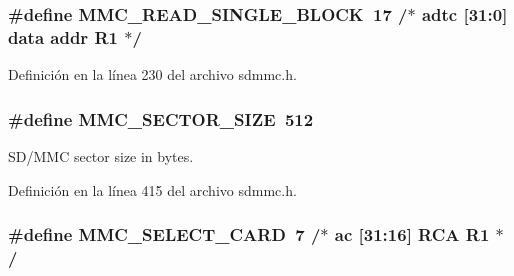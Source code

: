 \subsubsection[{\texorpdfstring{M\+M\+C\+\_\+\+R\+E\+A\+D\+\_\+\+S\+I\+N\+G\+L\+E\+\_\+\+B\+L\+O\+CK}{MMC_READ_SINGLE_BLOCK}}]{\setlength{\rightskip}{0pt plus 5cm}\#define M\+M\+C\+\_\+\+R\+E\+A\+D\+\_\+\+S\+I\+N\+G\+L\+E\+\_\+\+B\+L\+O\+CK~17		/$\ast$ adtc \mbox{[}31\+:0\mbox{]}  data addr  R1  $\ast$/}\hypertarget{group___c_h_i_p___s_d_m_m_c___definitions_gaa79d6d187ee2becb90a44ff70914acb8}{}\label{group___c_h_i_p___s_d_m_m_c___definitions_gaa79d6d187ee2becb90a44ff70914acb8}


Definición en la línea 230 del archivo sdmmc.\+h.

\subsubsection[{\texorpdfstring{M\+M\+C\+\_\+\+S\+E\+C\+T\+O\+R\+\_\+\+S\+I\+ZE}{MMC_SECTOR_SIZE}}]{\setlength{\rightskip}{0pt plus 5cm}\#define M\+M\+C\+\_\+\+S\+E\+C\+T\+O\+R\+\_\+\+S\+I\+ZE~512}\hypertarget{group___c_h_i_p___s_d_m_m_c___definitions_ga502a0143be4c303f3006c0888e1cec82}{}\label{group___c_h_i_p___s_d_m_m_c___definitions_ga502a0143be4c303f3006c0888e1cec82}


S\+D/\+M\+MC sector size in bytes. 



Definición en la línea 415 del archivo sdmmc.\+h.

\subsubsection[{\texorpdfstring{M\+M\+C\+\_\+\+S\+E\+L\+E\+C\+T\+\_\+\+C\+A\+RD}{MMC_SELECT_CARD}}]{\setlength{\rightskip}{0pt plus 5cm}\#define M\+M\+C\+\_\+\+S\+E\+L\+E\+C\+T\+\_\+\+C\+A\+RD~7		/$\ast$ ac   \mbox{[}31\+:16\mbox{]} R\+CA        R1  $\ast$/}\hypertarget{group___c_h_i_p___s_d_m_m_c___definitions_gacba63a975a42dfa2ff02772aa57e6a9b}{}\label{group___c_h_i_p___s_d_m_m_c___definitions_gacba63a975a42dfa2ff02772aa57e6a9b}


